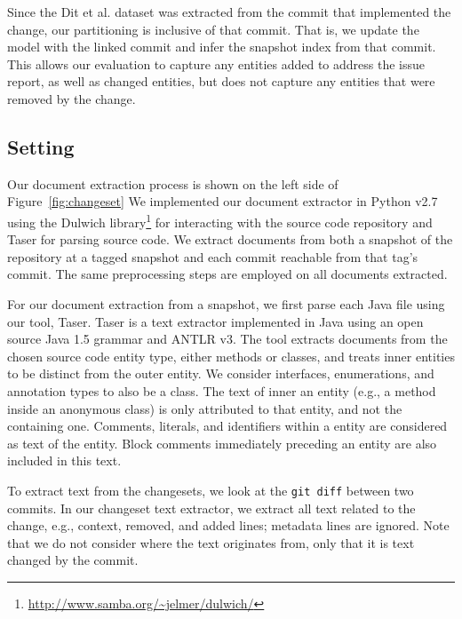 Since the Dit et al. dataset was extracted from the commit that implemented the
change, our partitioning is inclusive of that commit.  That is, we update the
model with the linked commit and infer the snapshot index from that commit.
This allows our evaluation to capture any entities added to address the issue
report, as well as changed entities, but does not capture any entities that were
removed by the change.




\subsection{Setting}

Our document extraction process is shown on the left side of Figure~\ref{fig:changeset}
We implemented our document extractor in Python v2.7
using the Dulwich library\footnote{\url{http://www.samba.org/~jelmer/dulwich/}}
for interacting with the source code repository and
Taser for parsing source code.
We extract documents from both a snapshot of the repository at a tagged
snapshot and each commit reachable from that tag's commit.
The same preprocessing steps are employed on all documents extracted.

For our document extraction from a snapshot, we first parse each Java file using our tool, Taser.
Taser is a text extractor implemented in Java using an open source Java 1.5 grammar and ANTLR v3.
The tool extracts documents from the chosen source code entity type,
either methods or classes, and treats inner entities to be distinct from the outer entity.
We consider interfaces, enumerations, and annotation types to also be a class.
The text of inner an entity (e.g., a method inside an anonymous class)
is only attributed to that entity, and not the containing one.
Comments, literals, and identifiers within a entity are considered as text of the entity.
Block comments immediately preceding an entity are also included in this text.

To extract text from the changesets, we look at
the \texttt{git diff} between two commits.
In our changeset text extractor, we extract all text related to the
change, e.g., context, removed, and added lines; metadata lines are ignored.
Note that we do not consider where the text originates from,
only that it is text changed by the commit.%

